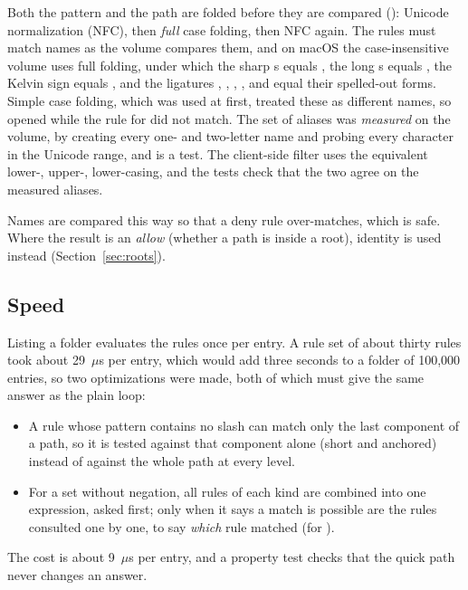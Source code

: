 Both the pattern and the path are folded before they are compared (): Unicode
normalization (NFC), then \emph{full} case folding, then NFC again.  The rules must
match names as the volume compares them, and on macOS the case-insensitive volume uses
full folding, under which the sharp s equals , the long s equals ,
the Kelvin sign equals , and the ligatures , , ,
,  and  equal their spelled-out forms.  Simple case
folding, which was used at first, treated these as different names, so
 opened  while the rule for  did not match.  The
set of aliases was \emph{measured} on the volume, by creating every one- and
two-letter name and probing every character in the Unicode range, and is a test.
The client-side filter uses the equivalent lower-, upper-, lower-casing, and the tests
check that the two agree on the measured aliases.

Names are compared this way so that a deny rule over-matches, which is safe.  Where the
result is an \emph{allow} (whether a path is inside a root), identity is used instead
(Section~\ref{sec:roots}).

\subsection{Speed}

Listing a folder evaluates the rules once per entry.  A rule set of about thirty rules
took about 29~$\mu$s per entry, which would add three seconds to a folder of 100{,}000
entries, so two optimizations were made, both of which must give the same answer as the
plain loop:

\begin{itemize}
  \item A rule whose pattern contains no slash can match only the last component of a
        path, so it is tested against that component alone (short and anchored) instead of
        against the whole path at every level.
  \item For a set without negation, all rules of each kind are combined into one
        expression, asked first; only when it says a match is possible are the rules
        consulted one by one, to say \emph{which} rule matched (for ).
\end{itemize}

The cost is about 9~$\mu$s per entry, and a property test checks that the quick path
never changes an answer.

